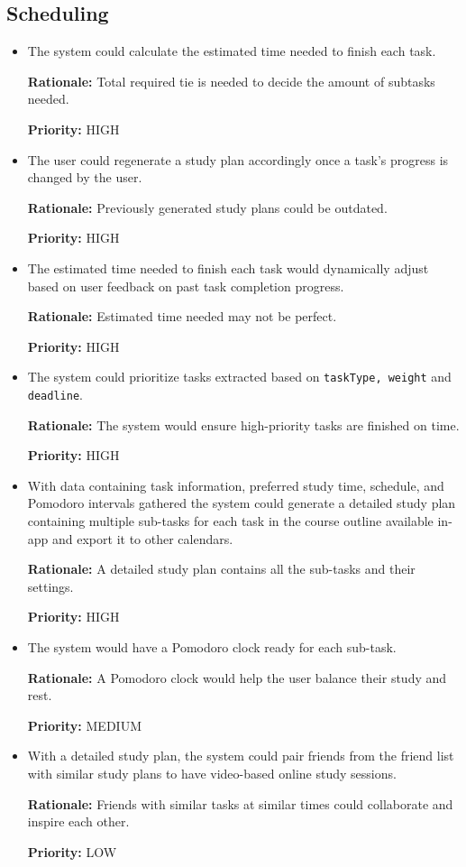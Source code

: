 \documentclass[12pt]{article}
\newcounter{reqnum} %
\newcommand{\rthereqnum}{FR\refstepcounter{reqnum}\thereqnum:}
\begin{document}
\subsection{Scheduling}
\begin{itemize}[leftmargin=16.5mm,labelsep=4mm,label=\rthereqnum]
\item
The system could calculate the estimated time needed to finish each task. 

\textbf{Rationale:} Total required tie is needed to decide the amount of subtasks needed.

\textbf{Priority:} HIGH
\item
The user could regenerate a study plan accordingly once a task's progress is changed by the user.

\textbf{Rationale:} Previously generated study plans could be outdated.

\textbf{Priority:} HIGH
\item
The estimated time needed to finish each task would dynamically adjust based on user feedback on past task completion progress.

\textbf{Rationale:} Estimated time needed may not be perfect.

\textbf{Priority:} HIGH
\item
The system could prioritize tasks extracted based on \texttt{taskType, weight} and \texttt{deadline}.

\textbf{Rationale:} The system would ensure high-priority tasks are finished on time.

\textbf{Priority:} HIGH
\item
With data containing task information, preferred study time, schedule, and Pomodoro intervals gathered the system could generate a detailed study plan containing multiple sub-tasks for each task in the course outline available in-app and export it to other calendars.

\textbf{Rationale:} A detailed study plan contains all the sub-tasks and their settings.

\textbf{Priority:} HIGH
\item
The system would have a Pomodoro clock ready for each sub-task.

\textbf{Rationale:} A Pomodoro clock would help the user balance their study and rest.

\textbf{Priority:} MEDIUM
\item
With a detailed study plan, the system could pair friends from the friend list with similar study plans to have video-based online study sessions.

\textbf{Rationale:} Friends with similar tasks at similar times could collaborate and inspire each other.

\textbf{Priority:} LOW
\end{itemize}
\end{document}
